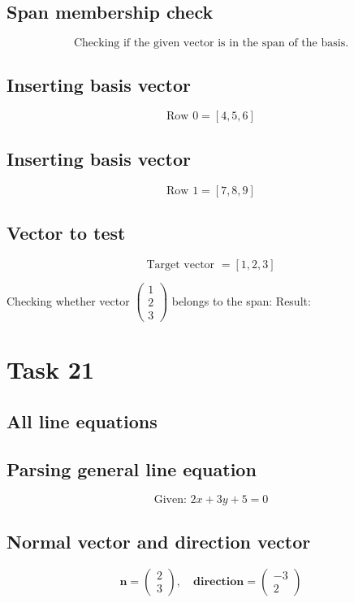 \documentclass{article}
\begin{document}
\subsection*{ \vspace{1em} Span membership check}
\[
\text{Checking if the given vector is in the span of the basis.}
\]
\subsection*{ \vspace{1em} Inserting basis vector}
\[
\text{Row } 0 = \left[4, 5, 6\right]
\]
\subsection*{ \vspace{1em} Inserting basis vector}
\[
\text{Row } 1 = \left[7, 8, 9\right]
\]
\subsection*{ \vspace{1em} Vector to test}
\[
\text{Target vector } = \left[1, 2, 3\right]
\]
\medskip

Checking whether vector $\begin{pmatrix}1 \\ 2 \\ 3\end{pmatrix}$ belongs to the span:
Result: 
\bigskip

\hrulefill
\bigskip

\section*{Task 21}

\subsection*{All line equations}
\subsection*{ \vspace{1em} Parsing general line equation}
\[
\text{Given: } 2x + 3y + 5 = 0
\]
\subsection*{ \vspace{1em} Normal vector and direction vector}
\[
\mathbf{n} = \begin{pmatrix}2 \\ 3\end{pmatrix}, \quad
           \mathbf{direction} = \begin{pmatrix}-3 \\ 2\end{pmatrix}
\]
\end{document}
